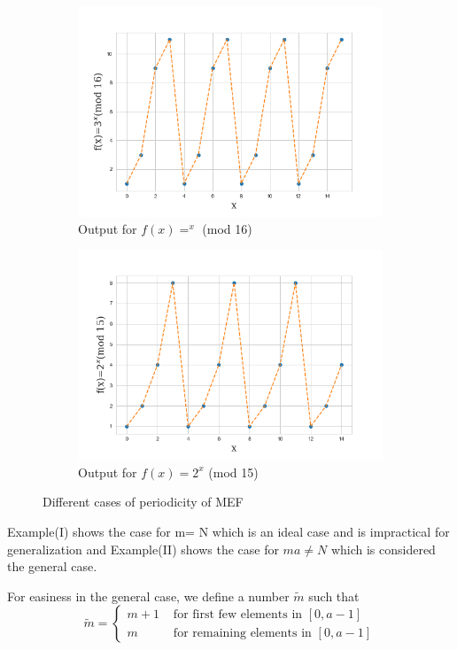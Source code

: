 \begin{figure}[H]
  \centering
  \begin{subfigure}[b]{0.4\linewidth}
    \includegraphics[width=\linewidth]{figures/periodicfunction(3,16).png}
    
    \caption{Output for $f(x)=^x$ (mod 16) }
  \end{subfigure}
  \begin{subfigure}[b]{0.4\linewidth}
    \includegraphics[width=\linewidth]{figures/periodicfunction(2,15).png}
    \caption{Output for $f(x)=2^x$ (mod 15)}
  \end{subfigure}
  \caption{Different cases of periodicity of MEF}
  \label{fig: MEF periodic output graph}
\end{figure}

Example(I) shows the case for m= N which is an ideal case and is impractical for generalization and Example(II) shows the case for $ma \neq N$ which is considered the general case. \par
For easiness in the general case, we define  a number $\tilde{m}$ such that
\\  
$$\tilde{m} = \begin{cases}
    m +1 &\text{ for first few elements in $[0,a-1]$} \\
    m  &\text{ for remaining elements in $[0,a-1]$}
\end{cases}$$

